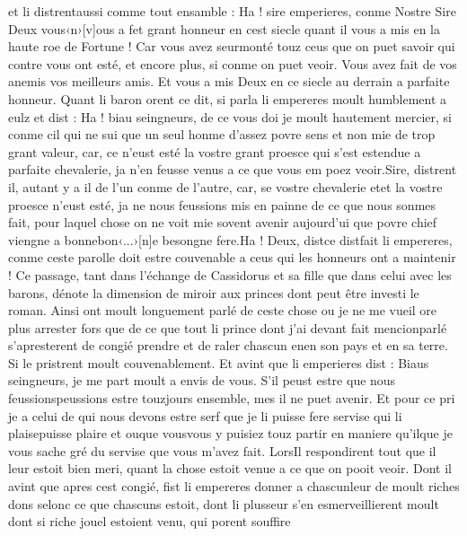 \documentclass{article}
\begin{document}
\begin{pages}
   et li distrentaussi comme tout ensamble :
   Ha ! sire emperieres, conme Nostre Sire Deux 
      vous‹n›[v]ous a fet grant honneur
      en cest siecle quant il vous a mis en la haute roe de Fortune ! Car vous avez seurmonté touz ceus que on puet savoir 
      qui contre vous ont esté, et encore plus, si conme on puet veoir. Vous avez fait de vos anemis vos meilleurs amis. 
      Et vous a mis Deux en ce siecle au derrain a parfaite honneur. \pend
\pstart Quant li baron orent ce dit, si parla li empereres 
   moult humblement a eulz et dist :
   Ha ! biau seingneurs, de ce vous doi je moult hautement mercier,
      si conme cil qui ne sui que un seul honme d’assez povre sens et non mie de trop grant valeur,
      car, ce n’eust esté la vostre grant proesce qui s’est estendue a parfaite chevalerie,
      ja n’en feusse venus a ce que vous em poez veoir.Sire, distrent il, autant y a il de l’un conme de l’autre,
      car, se vostre chevalerie etet la vostre proesce n’eust esté, 
      ja ne nous feussions mis en painne de ce que nous sonmes fait, pour laquel chose on ne voit mie sovent avenir aujourd’ui que povre 
      chief viengne a bonnebon‹...›[n]e besongne fere.Ha ! Deux, distce distfait 
      li empereres,
      conme ceste parolle doit estre couvenable a ceus qui les honneurs ont a maintenir !
   Ce passage, tant dans l'échange de Cassidorus et sa fille que dans celui avec les barons, dénote la 
   dimension de miroir aux princes dont peut être investi le roman. \pend
\pstart Ainsi ont moult longuement parlé de ceste chose ou
   je ne me vueil ore plus arrester fors que de ce que tout li prince
   dont j’ai devant 
      fait mencionparlé 
   s’apresterent de congié prendre et de raler chascun enen son pays et en sa terre.
   Si le pristrent moult couvenablement. Et avint que li emperieres dist :
   Biaus seingneurs, je me part moult a envis de vous. 
      S’il peust estre que nous feussionspeussions estre touzjours ensemble, 
      mes il ne puet avenir. Et pour ce pri je a celui de qui nous devons 
      estre serf que je li puisse fere servise qui
      li plaisepuisse plaire et 
      ouque vousvous y 
      puisiez touz partir en maniere qu’ilque je vous sache gré du servise 
      que vous m’avez fait.
   LorsIl respondirent tout que il leur estoit bien meri, quant la chose estoit venue 
      a ce que on pooit veoir. Dont il avint que apres cest congié,  fist li empereres 
   donner a chascunleur de moult riches dons selonc ce que chascuns estoit, 
   dont li plusseur s’en esmerveillierent moult dont si riche jouel estoient venu, qui porent souffire 

\end{pages}
\end{document}
